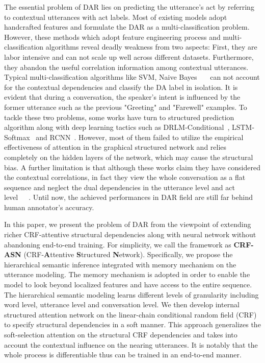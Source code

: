 \documentclass[sigconf]{acmart}
\begin{document}
The essential problem of DAR lies on predicting the utterance's act by referring to contextual utterances with act labels. Most of existing models adopt handcrafted features and formulate the DAR as a multi-classification problem. However, these methods which adopt feature engineering process and multi-classification algorithms reveal deadly weakness from two aspects: First, they are labor intensive and can not scale up well across different datasets. Furthermore, they abandon the useful correlation information among contextual utterances. Typical multi-classification algorithms like SVM, Naive Bayes~\cite{grau2004dialogue}~\cite{Ang2005AutomaticDA}~\cite{stolcke2006dialogue} can not account for the contextual dependencies and classify the DA label in isolation. It is evident that during a conversation, the speaker's intent is influenced by the former utterance such as the previous "Greeting" and "Farewell" examples. To tackle these two problems, some works have turn to structured prediction algorithm along with deep learning tactics such as DRLM-Conditional~\cite{Ji2016ALV}, LSTM-Softmax~\cite{Khanpour2016Dialogue} and RCNN~\cite{Kalchbrenner2013Recurrent}. However, most of them failed to utilize the empirical effectiveness of attention in the graphical structured network and relies completely on the hidden layers of the network, which may cause the structural bias. A further limitation is that although these works claim they have considered the contextual correlations, in fact they view the whole conversation as a flat sequence and neglect the dual dependencies in the utterance level and act level~\cite{blunsom2013recurrent}~\cite{huangbidirectional}~\cite{maend}. Until now, the achieved performances in DAR field are still far behind human annotator's accuracy.

In this paper, we present the problem of DAR from the viewpoint of extending richer CRF-attentive structural dependencies along with neural network without abandoning end-to-end training. For simplicity, we call the framework as \textbf{CRF-ASN} (CRF-\textbf{A}ttentive \textbf{S}tructured \textbf{N}etwork). Specifically, we propose the hierarchical semantic inference integrated with memory mechanism on the utterance modeling. The memory mechanism is adopted in order to enable the model to look beyond localized features and have access to the entire sequence. The hierarchical semantic modeling learns different levels of granularity including word level, utterance level and conversation level. We then develop internal structured attention network on the linear-chain conditional random field (CRF) to specify structural dependencies in a soft manner. This approach generalizes the soft-selection attention on the structural CRF dependencies and takes into account the contextual influence on the nearing utterances. It is notably that the whole process is differentiable thus can be trained in an end-to-end manner. 
\end{document}
